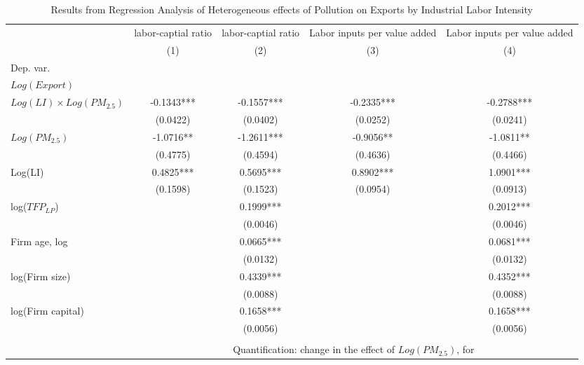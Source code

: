 \documentclass[12pt]{article}
\begin{document}
\begin{table}[H]\centering
  \caption{Results from Regression Analysis of Heterogeneous effects of Pollution on Exports by Industrial Labor Intensity}\label{tab:hetero_LI}
  \resizebox{\textwidth}{!}
  {
  \begin{tabular}{l*{4}{c}}
    \hline\hline
    &\multicolumn{1}{c}{labor-captial ratio}&\multicolumn{1}{c}{labor-captial ratio}&\multicolumn{1}{c}{Labor inputs per value added}&\multicolumn{1}{c}{Labor inputs per value added}\\
    &\multicolumn{1}{c}{(1)}&\multicolumn{1}{c}{(2)}&\multicolumn{1}{c}{(3)}&\multicolumn{1}{c}{(4)}\\
    Dep. var. &&&&\\
    $Log(Export)$ &&&&\\
    \hline
    $Log(LI) \times Log(PM_{2.5})$ &-0.1343***&-0.1557***&-0.2335***&-0.2788***\\
                                   &(0.0422)&(0.0402)&(0.0252)&(0.0241)\\
    $Log(PM_{2.5})$                &-1.0716**&-1.2611***&-0.9056**&-1.0811**\\
                                  &(0.4775)&(0.4594)&(0.4636)&(0.4466)\\
    Log(LI)                       &0.4825***&0.5695***&0.8902***&1.0901***\\
                                  &(0.1598)&(0.1523)&(0.0954)&(0.0913)\\
    log($TFP_{LP}$)               &        &0.1999*** &      &0.2012***\\
                                  &        &(0.0046)  &       &(0.0046) \\
    Firm age, log                 &          &0.0665*** &       &0.0681***\\
                                   &         &(0.0132)   &       & (0.0132)\\
    log(Firm size)                 &         &0.4339***   &      &0.4352***\\
                                    &        & (0.0088)   &&(0.0088)\\
    log(Firm capital)                &       &0.1658***   &&0.1658***\\ 
                                      &      &(0.0056)    &&(0.0056)\\  
                                      &&&&\\
                                            &\multicolumn{4}{c}{Quantification: change in the effect of $Log(PM_{2.5})$, for}\\           

\end{tabular}}
\end{table}
\end{document}
